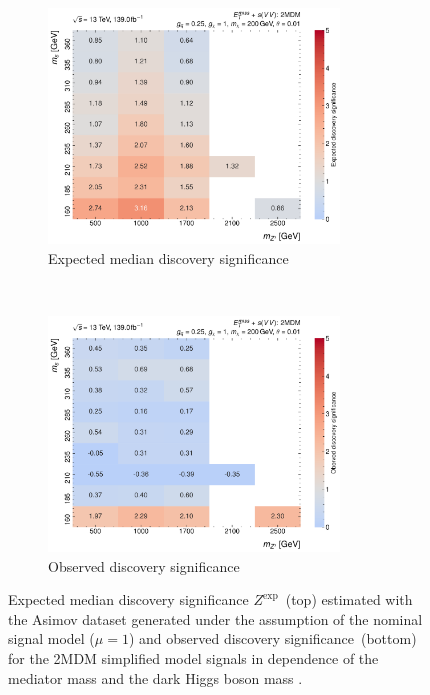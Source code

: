 \begin{figure}[htbp]
\centering
  \begin{subfigure}{1.\textwidth}
    \centering
    \includegraphics[width=0.85\textwidth]{figures/monoS/monoS-2mdm-significances_expected.pdf}
    \caption{Expected median discovery significance}
  \end{subfigure}
  \\
  \begin{subfigure}{1.\textwidth}
    \centering
    \includegraphics[width=0.85\textwidth]{figures/monoS/monoS-2mdm-significances_observed.pdf}
    \caption{Observed discovery significance}
  \end{subfigure}
  \caption{Expected median discovery significance \(Z^{\text{exp}}\)~(top) estimated with the Asimov dataset generated under the assumption of the nominal signal model (\(\mu=1\)) and observed discovery significance~(bottom) for the 2MDM simplified model signals in dependence of the \PZprime mediator mass \mZp and the dark Higgs boson mass \ms.}
  \label{tab:monoSVV:results:results:observed:significance}
\end{figure}

